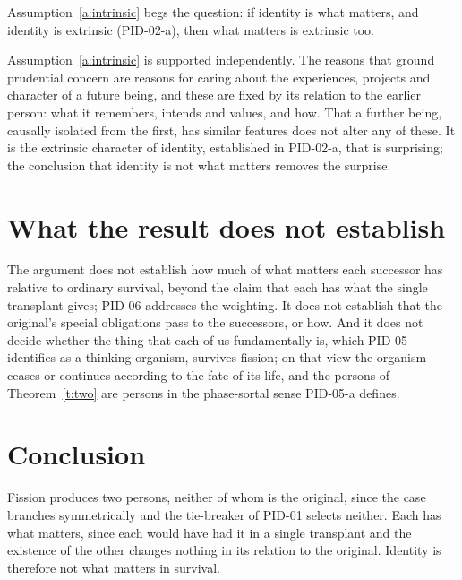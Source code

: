 \documentclass{situationist-preprint}
\begin{document}
\begin{objection}
Assumption~\ref{a:intrinsic} begs the question: if identity is what matters, and identity is extrinsic (PID-02-a), then what matters is extrinsic too.
\end{objection}

\begin{reply}
Assumption~\ref{a:intrinsic} is supported independently. The reasons that ground prudential concern are reasons for caring about the experiences, projects and character of a future being, and these are fixed by its relation to the earlier person: what it remembers, intends and values, and how. That a further being, causally isolated from the first, has similar features does not alter any of these. It is the extrinsic character of identity, established in PID-02-a, that is surprising; the conclusion that identity is not what matters removes the surprise.
\end{reply}

\section{What the result does not establish}\label{s:not}

The argument does not establish how much of what matters each successor has relative to ordinary survival, beyond the claim that each has what the single transplant gives; PID-06 addresses the weighting. It does not establish that the original's special obligations pass to the successors, or how. And it does not decide whether the thing that each of us fundamentally is, which PID-05 identifies as a thinking organism, survives fission; on that view the organism ceases or continues according to the fate of its life, and the persons of Theorem~\ref{t:two} are persons in the phase-sortal sense PID-05-a defines.

\section{Conclusion}

Fission produces two persons, neither of whom is the original, since the case branches symmetrically and the tie-breaker of PID-01 selects neither. Each has what matters, since each would have had it in a single transplant and the existence of the other changes nothing in its relation to the original. Identity is therefore not what matters in survival.
\end{document}
